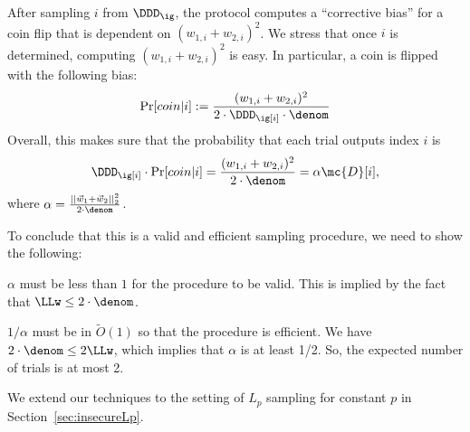 
\item After sampling $i$ from $\DDD_\ig$, the protocol computes a
``corrective bias'' for a coin flip that is dependent on $(w_{1,i} + w_{2,i})^2$. We stress that once $i$ is determined,
computing $(w_{1,i} + w_{2,i})^2$ is easy. In particular, a coin is
flipped with the following bias:
$$ \Pr[ coin | i] := \frac{(w_{1,i} + w_{2,i})^2}{2 \cdot \DDD_\ig[i] \cdot \denom}  $$
\EEN
Overall, this makes sure that the probability that each trial outputs
index $i$ is 
$$ \DDD_\ig[i] \cdot \Pr[coin|i]  = \frac{(w_{1,i} + w_{2,i})^2}{2 \cdot \denom} = \alpha \mc{D}[i],$$
where $\alpha = \frac{||\vec{w}_1 + \vec{w}_2||_2^2}{2 \cdot \denom}$.

To conclude that this is a valid and efficient sampling procedure, we need to show the following:
\BI
\item $\alpha$ must be less than $1$ for the procedure to be valid. This is implied by the fact that
$\LLw \le 2 \cdot \denom$. 
\item $1/\alpha$ must be in $\tilde{O}(1)$ so that the procedure is efficient. We have $2 \cdot \denom \le 2 \LLw$, which implies that $\alpha$ is at least 1/2. So, the expected number of trials is at most 2. 
\EI

We extend our techniques to the setting of $L_p$
sampling for constant $p$ in Section~\ref{sec:insecureLp}.


